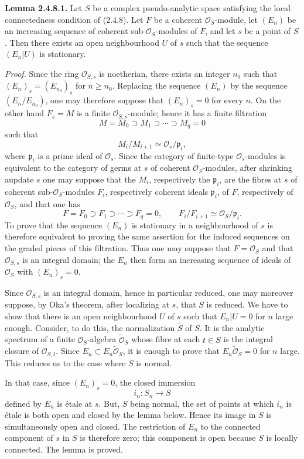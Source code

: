 \documentclass[11pt]{article}
\begin{document}
\textbf{Lemma 2.4.8.1.} Let $S$ be a complex pseudo-analytic space satisfying the local connectedness condition of (2.4.8). Let $F$ be a coherent $\mathcal O_S$-module, let $(E_n)$ be an increasing sequence of coherent sub-$\mathcal O_S$-modules of $F$, and let $s$ be a point of $S$. Then there exists an open neighbourhood $U$ of $s$ such that the sequence $(E_n|U)$ is stationary.

\emph{Proof.} Since the ring $\mathcal O_{S,s}$ is noetherian, there exists an integer $n_0$ such that $(E_n)_s=(E_{n_0})_s$ for $n\geq n_0$. Replacing the sequence $(E_n)$ by the sequence $(E_n/E_{n_0})$, one may therefore suppose that $(E_n)_s=0$ for every $n$. On the other hand $F_s=M$ is a finite $\mathcal O_{S,s}$-module; hence it has a finite filtration
\[
 M=M_0\supset M_1\supset\cdots\supset M_q=0
\]
such that
\[
 M_i/M_{i+1}\simeq \mathcal O_s/\mathfrak p_i,
\]
where $\mathfrak p_i$ is a prime ideal of $\mathcal O_s$. Since the category of finite-type $\mathcal O_s$-modules is equivalent to the category of germs at $s$ of coherent $\mathcal O_S$-modules, after shrinking aupdate $s$ one may suppose that the $M_i$, respectively the $\mathfrak p_i$, are the fibres at $s$ of coherent sub-$\mathcal O_S$-modules $F_i$, respectively coherent ideals $\mathfrak p_i$, of $F$, respectively of $\mathcal O_S$, and that one has
\[
 F=F_0\supset F_1\supset\cdots\supset F_q=0,
 \qquad F_i/F_{i+1}\simeq\mathcal O_S/\mathfrak p_i.
\]
To prove that the sequence $(E_n)$ is stationary in a neighbourhood of $s$ is therefore equivalent to proving the same assertion for the induced sequences on the graded pieces of this filtration. Thus one may suppose that $F=\mathcal O_S$ and that $\mathcal O_{S,s}$ is an integral domain; the $E_n$ then form an increasing sequence of ideals of $\mathcal O_S$ with $(E_n)_s=0$.

Since $\mathcal O_{S,s}$ is an integral domain, hence in particular reduced, one may moreover suppose, by Oka's theorem, after localizing at $s$, that $S$ is reduced. We have to show that there is an open neighbourhood $U$ of $s$ such that $E_n|U=0$ for $n$ large enough. Consider, to do this, the normalization $\widetilde S$ of $S$. It is the analytic spectrum of a finite $\mathcal O_S$-algebra $\widetilde{\mathcal O}_S$ whose fibre at each $t\in S$ is the integral closure of $\mathcal O_{S,t}$. Since $E_n\subset E_n\widetilde{\mathcal O}_S$, it is enough to prove that $E_n\widetilde{\mathcal O}_S=0$ for $n$ large. This reduces us to the case where $S$ is normal.

In that case, since $(E_n)_s=0$, the closed immersion
\[
 i_n:S_n\longrightarrow S
\]
defined by $E_n$ is étale at $s$. But, $S$ being normal, the set of points at which $i_n$ is étale is both open and closed by the lemma below. Hence its image in $S$ is simultaneously open and closed. The restriction of $E_n$ to the connected component of $s$ in $S$ is therefore zero; this component is open because $S$ is locally connected. The lemma is proved.
\end{document}
